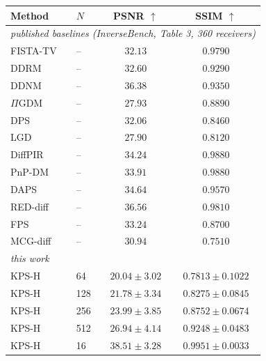 \small
\begin{tabular}{llcc}
\toprule
Method & $N$ & PSNR $\uparrow$ & SSIM $\uparrow$ \\
\midrule
\multicolumn{4}{l}{\emph{published baselines (InverseBench, Table 3, 360 receivers)}} \\
FISTA-TV & -- & $32.13$ & $0.9790$ \\
DDRM & -- & $32.60$ & $0.9290$ \\
DDNM & -- & $36.38$ & $0.9350$ \\
$\Pi$GDM & -- & $27.93$ & $0.8890$ \\
DPS & -- & $32.06$ & $0.8460$ \\
LGD & -- & $27.90$ & $0.8120$ \\
DiffPIR & -- & $34.24$ & $0.9880$ \\
PnP-DM & -- & $33.91$ & $0.9880$ \\
DAPS & -- & $34.64$ & $0.9570$ \\
RED-diff & -- & $36.56$ & $0.9810$ \\
FPS & -- & $33.24$ & $0.8700$ \\
MCG-diff & -- & $30.94$ & $0.7510$ \\
\midrule
\multicolumn{4}{l}{\emph{this work}} \\
KPS-H & 64 & $20.04 \pm 3.02$ & $0.7813 \pm 0.1022$ \\
KPS-H & 128 & $21.78 \pm 3.34$ & $0.8275 \pm 0.0845$ \\
KPS-H & 256 & $23.99 \pm 3.85$ & $0.8752 \pm 0.0674$ \\
KPS-H & 512 & $26.94 \pm 4.14$ & $0.9248 \pm 0.0483$ \\
KPS-H & 16 & $38.51 \pm 3.28$ & $0.9951 \pm 0.0033$ \\
\bottomrule
\end{tabular}
